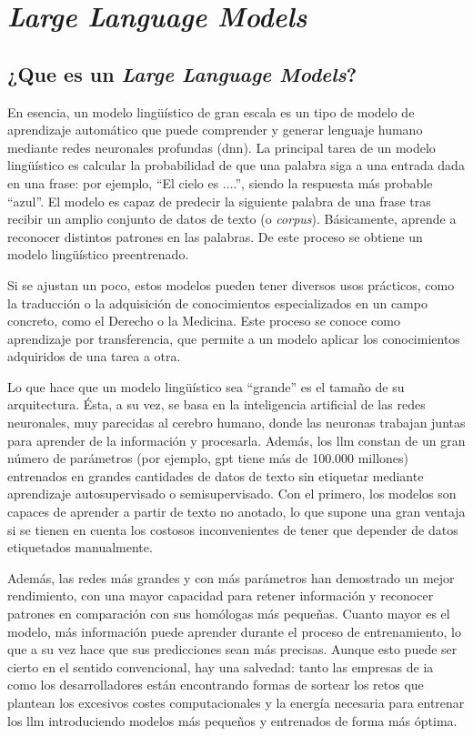 \section{\textit{Large Language Models}}

\subsection{¿Que es un \textit{Large Language Models}?}

En esencia, un modelo lingüístico de gran escala es un tipo de modelo de aprendizaje automático que puede comprender y generar lenguaje humano mediante redes neuronales profundas (\acrlong{dnn}). La principal tarea de un modelo lingüístico es calcular la probabilidad de que una palabra siga a una entrada dada en una frase: por ejemplo, ``El cielo es ....'', siendo la respuesta más probable ``azul''. El modelo es capaz de predecir la siguiente palabra de una frase tras recibir un amplio conjunto de datos de texto (o \textit{corpus}). Básicamente, aprende a reconocer distintos patrones en las palabras. De este proceso se obtiene un modelo lingüístico preentrenado.

Si se ajustan un poco, estos modelos pueden tener diversos usos prácticos, como la traducción o la adquisición de conocimientos especializados en un campo concreto, como el Derecho o la Medicina. Este proceso se conoce como aprendizaje por transferencia, que permite a un modelo aplicar los conocimientos adquiridos de una tarea a otra.

Lo que hace que un modelo lingüístico sea ``grande'' es el tamaño de su arquitectura. Ésta, a su vez, se basa en la inteligencia artificial de las redes neuronales, muy parecidas al cerebro humano, donde las neuronas trabajan juntas para aprender de la información y procesarla. Además, los \acrshort{llm} constan de un gran número de parámetros (por ejemplo, \acrshort{gpt} tiene más de 100.000 millones) entrenados en grandes cantidades de datos de texto sin etiquetar mediante aprendizaje autosupervisado o semisupervisado. Con el primero, los modelos son capaces de aprender a partir de texto no anotado, lo que supone una gran ventaja si se tienen en cuenta los costosos inconvenientes de tener que depender de datos etiquetados manualmente.

Además, las redes más grandes y con más parámetros han demostrado un mejor rendimiento, con una mayor capacidad para retener información y reconocer patrones en comparación con sus homólogas más pequeñas. Cuanto mayor es el modelo, más información puede aprender durante el proceso de entrenamiento, lo que a su vez hace que sus predicciones sean más precisas. Aunque esto puede ser cierto en el sentido convencional, hay una salvedad: tanto las empresas de \acrshort{ia} como los desarrolladores están encontrando formas de sortear los retos que plantean los excesivos costes computacionales y la energía necesaria para entrenar los \acrshort{llm} introduciendo modelos más pequeños y entrenados de forma más óptima.


